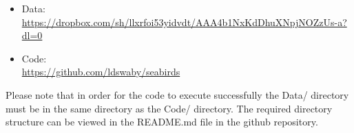 \documentclass[11pt]{article}
\begin{document}
    \begin{itemize}
      \item Data: \url{https://dropbox.com/sh/llxrfoi53yidvdt/AAA4b1NxKdDhuXNpjNOZzUs-a?dl=0}
      \item Code: \\ \url{https://github.com/ldswaby/seabirds}
    \end{itemize}
    
    \noindent Please note that in order for the code to execute successfully the Data/ directory must be in the same directory as the Code/ directory. The required directory structure can be viewed in the README.md file in the github repository.

    \newpage
    
    
\end{document}
